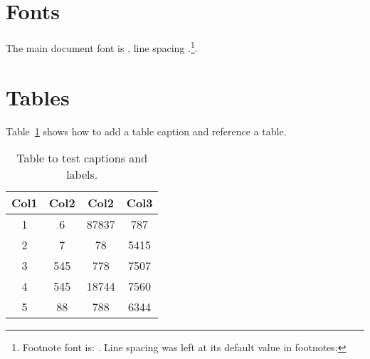 \section{Fonts}

The main document font is \fontname\font, line spacing \the\baselineskip.\footnote{Footnote font is: \fontname\font
. Line spacing was left at its default value in footnotes: \the\baselineskip}.

\section{Tables}

Table~\ref{table:data} shows how to add a table caption and reference a table.
\begin{table}[h!]
\centering
\begin{tabular}{||c c c c||} 
 \hline
 Col1 & Col2 & Col2 & Col3 \\ [0.5ex] 
 \hline\hline
 1 & 6 & 87837 & 787 \\ 
 2 & 7 & 78 & 5415 \\
 3 & 545 & 778 & 7507 \\
 4 & 545 & 18744 & 7560 \\
 5 & 88 & 788 & 6344 \\ [1ex] 
 \hline
\end{tabular}
\caption{Table to test captions and labels.}
\label{table:data}
\end{table}

